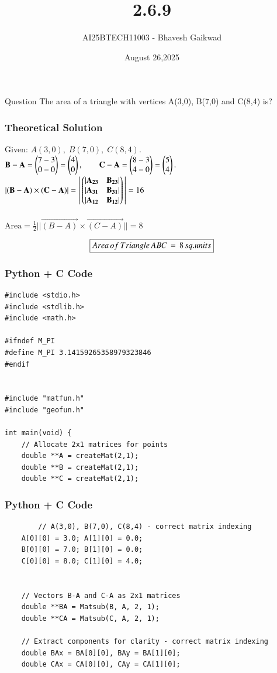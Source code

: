 \documentclass{beamer}
\title
{2.6.9}
\date{August 26,2025}
\author 
{AI25BTECH11003 - Bhavesh Gaikwad}
\begin{document}
\frame{\titlepage}
\begin{frame}{Question}
\centering
The area of a triangle with vertices A(3,0), B(7,0) and C(8,4) is?
\end{frame}


\begin{frame}[fragile]
    \frametitle{Theoretical Solution}
Given: $A(3,0),\; B(7,0),\; C(8,4).$\\

$
\mathbf{B}-\mathbf{A}=\begin{pmatrix}7-3\\0-0\end{pmatrix}
=\begin{pmatrix}4\\0\end{pmatrix},\qquad
\mathbf{C}-\mathbf{A}=\begin{pmatrix}8-3\\4-0\end{pmatrix} = \begin{pmatrix}5\\4\end{pmatrix}.
$\\

$|\mathbf{(B-A)} \times \mathbf{(C-A)}| = \left|\,\begin{pmatrix}|\mathbf{A_{23}} & \mathbf{B_{23}}| \\ |\mathbf{A_{31}} & \mathbf{B_{31}}| \\ |\mathbf{A_{12}} & \mathbf{B_{12}}|\end{pmatrix}\,\right| = 16 $\\\\


$
\text{Area}=\frac{1}{2}||\vec{(B-A)} \times \vec{(C-A)}|| = 8
$

\begin{align}
    \centering
    \boxed{Area \, of \, Triangle \, ABC \,= \,8\,sq.units}
\end{align}
\end{frame}


\begin{frame}[fragile]
    \frametitle{Python + C Code}
    \begin{lstlisting}
#include <stdio.h>
#include <stdlib.h>
#include <math.h>

#ifndef M_PI
#define M_PI 3.14159265358979323846
#endif


#include "matfun.h"
#include "geofun.h"

int main(void) {
    // Allocate 2x1 matrices for points
    double **A = createMat(2,1);
    double **B = createMat(2,1);
    double **C = createMat(2,1);
    \end{lstlisting}
\end{frame}


\begin{frame}[fragile]
    \frametitle{Python + C Code}
    \begin{lstlisting}
        // A(3,0), B(7,0), C(8,4) - correct matrix indexing
    A[0][0] = 3.0; A[1][0] = 0.0;
    B[0][0] = 7.0; B[1][0] = 0.0;
    C[0][0] = 8.0; C[1][0] = 4.0;


    // Vectors B-A and C-A as 2x1 matrices
    double **BA = Matsub(B, A, 2, 1);
    double **CA = Matsub(C, A, 2, 1);

    // Extract components for clarity - correct matrix indexing
    double BAx = BA[0][0], BAy = BA[1][0];
    double CAx = CA[0][0], CAy = CA[1][0];
    \end{lstlisting}
\end{frame}
\end{document}
